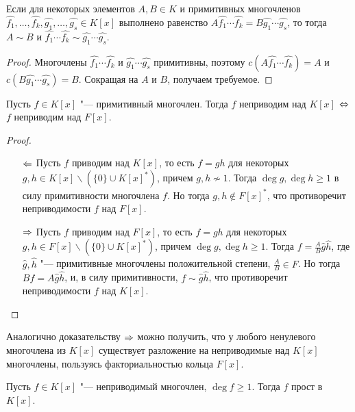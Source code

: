 \begin{corollary}
	Если для некоторых элементов $A, B \in K$ и примитивных многочленов $\widehat{f_1}, \dotsc, \widehat{f_k}, \widehat{g_1}, \dotsc, \widehat{g_s} \in K[x]$ выполнено равенство $A\widehat{f_1}\dotsm\widehat{f_k} = B\widehat{g_1}\dotsm\widehat{g_s}$, то тогда $A \sim B$ и $\widehat{f_1}\dotsm\widehat{f_k} \sim \widehat{g_1}\dotsm\widehat{g_s}$.
\end{corollary}

\begin{proof}
	Многочлены $\widehat{f_1}\dotsm\widehat{f_k}$ и $\widehat{g_1}\dotsm\widehat{g_s}$ примитивны, поэтому $c(A\widehat{f_1}\dotsm\widehat{f_k}) = A$ и $c(B\widehat{g_1}\dotsm\widehat{g_s}) = B$. Сокращая на $A$ и $B$, получаем требуемое.
\end{proof}

\begin{proposition}
	Пусть $f \in K[x]$ "--- примитивный многочлен. Тогда $f$ неприводим над $K[x]$ $\Leftrightarrow$ $f$ неприводим над $F[x]$.
\end{proposition}

\begin{proof}~
	\begin{itemize}
		\item[$\Leftarrow$] Пусть $f$ приводим над $K[x]$, то есть $f = gh$ для некоторых $g, h \in K[x] \backslash (\{0\} \cup K[x]^*)$, причем $g, h \not\sim 1$. Тогда $\deg{g}, \deg{h} \ge 1$ в силу примитивности многочлена $f$. Но тогда $g, h \not\in F[x]^*$, что противоречит неприводимости $f$ над $F[x]$.
		\item[$\Rightarrow$] Пусть $f$ приводим над $F[x]$, то есть $f = gh$ для некоторых $g, h \in F[x] \backslash (\{0\} \cup K[x]^*)$, причем $\deg{g}, \deg{h} \ge 1$. Тогда $f = \frac{A}{B}\widehat{g}\widehat{h}$, где $\widehat{g}, \widehat{h}$ "--- примитивные многочлены положительной степени, $\frac AB \in F$. Но тогда $Bf = A\widehat{g}\widehat{h}$, и, в силу примитивности, $f \sim \widehat{g}\widehat{h}$, что противоречит неприводимости $f$ над $K[x]$.\qedhere
	\end{itemize}
\end{proof}

\begin{note}
	Аналогично доказательству $\Rightarrow$ можно получить, что у любого ненулевого многочлена из $K[x]$ существует разложение на неприводимые над $K[x]$ многочлены, пользуясь факториальностью кольца $F[x]$.
\end{note}

\begin{corollary}
	Пусть $f \in K[x]$ "--- неприводимый многочлен, $\deg{f} \ge 1$. Тогда $f$ прост в $K[x]$.
\end{corollary}

